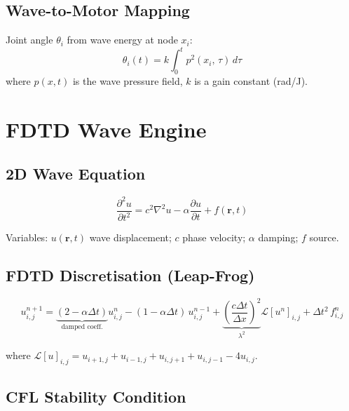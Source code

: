 \documentclass[12pt, a4paper]{article}
\begin{document}
\subsection{Wave-to-Motor Mapping}

Joint angle $\theta_i$ from wave energy at node $x_i$:
\begin{equation}\label{eq:joint_angle}
  \theta_i(t) = k \int_0^t p^2(x_i,\, \tau)\, d\tau
\end{equation}
where $p(x,t)$ is the wave pressure field, $k$ is a gain constant (rad/J).

\section{FDTD Wave Engine}

\subsection{2D Wave Equation}

\begin{equation}\label{eq:wave_pde}
  \frac{\partial^2 u}{\partial t^2}
  = c^2 \nabla^2 u
  - \alpha \frac{\partial u}{\partial t}
  + f(\mathbf{r},t)
\end{equation}

Variables: $u(\mathbf{r},t)$ wave displacement; $c$ phase velocity; $\alpha$ damping; $f$ source.

\subsection{FDTD Discretisation (Leap-Frog)}

\begin{equation}\label{eq:fdtd}
  u^{n+1}_{i,j}
  = \underbrace{(2 - \alpha\Delta t)}_{\text{damped coeff.}} u^n_{i,j}
    - (1 - \alpha\Delta t)\, u^{n-1}_{i,j}
    + \underbrace{\left(\frac{c\Delta t}{\Delta x}\right)^2}_{\lambda^2}
      \mathcal{L}[u^n]_{i,j}
    + \Delta t^2\, f^n_{i,j}
\end{equation}

where $\mathcal{L}[u]_{i,j} = u_{i+1,j} + u_{i-1,j} + u_{i,j+1} + u_{i,j-1} - 4u_{i,j}$.

\subsection{CFL Stability Condition}
\end{document}
